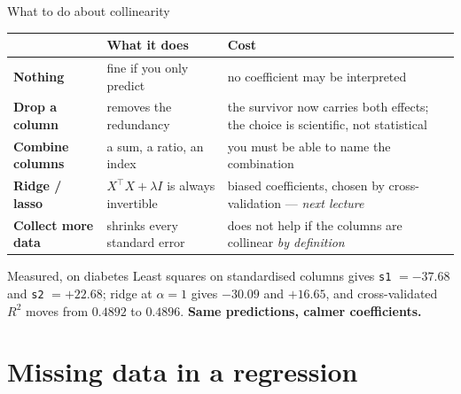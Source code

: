 \documentclass[aspectratio=169]{beamer}
\newcommand{\Xt}{X^{\!\top}}
\begin{document}
\begin{frame}[shrink=6]{What to do about collinearity}
  \begin{center}\small
  \begin{tabular}{@{}lp{4.6cm}p{4.4cm}@{}}
    \toprule
    & \textbf{What it does} & \textbf{Cost}\\
    \midrule
    \textbf{Nothing} & fine if you only predict &
      no coefficient may be interpreted\\[3pt]
    \textbf{Drop a column} & removes the redundancy &
      the survivor now carries both effects; the choice is scientific, not
      statistical\\[3pt]
    \textbf{Combine columns} & a sum, a ratio, an index &
      you must be able to name the combination\\[3pt]
    \textbf{Ridge / lasso} & $\Xt X + \lambda I$ is always invertible &
      biased coefficients, chosen by cross-validation --- \emph{next
      lecture}\\[3pt]
    \textbf{Collect more data} & shrinks every standard error &
      does not help if the columns are collinear \emph{by definition}\\
    \bottomrule
  \end{tabular}
  \end{center}
  \begin{alertblock}{Measured, on diabetes}
    \small Least squares on standardised columns gives \texttt{s1} $= -37.68$
    and \texttt{s2} $= +22.68$; ridge at $\alpha = 1$ gives $-30.09$ and
    $+16.65$, and cross-validated $R^2$ moves from $0.4892$ to $0.4896$.
    \textbf{Same predictions, calmer coefficients.}
  \end{alertblock}
\end{frame}

\section[Missing]{Missing data in a regression}
\label{sec:missing}
\end{document}
